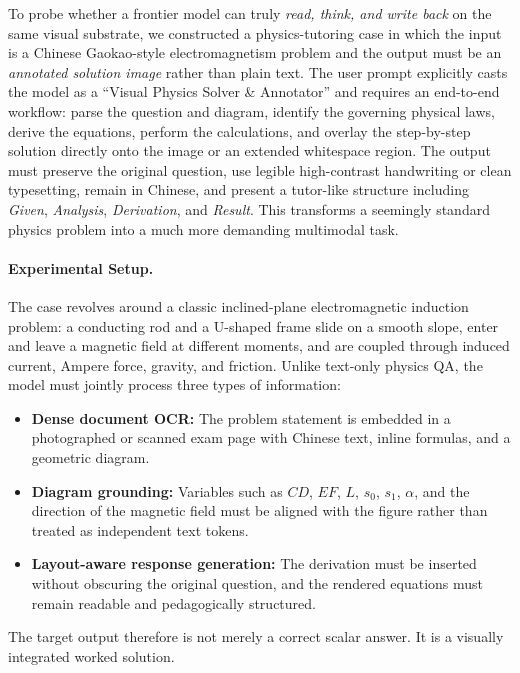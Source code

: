 To probe whether a frontier model can truly \emph{read, think, and write back} on the same visual substrate, we constructed a physics-tutoring case in which the input is a Chinese Gaokao-style electromagnetism problem and the output must be an \emph{annotated solution image} rather than plain text. The user prompt explicitly casts the model as a ``Visual Physics Solver \& Annotator'' and requires an end-to-end workflow: parse the question and diagram, identify the governing physical laws, derive the equations, perform the calculations, and overlay the step-by-step solution directly onto the image or an extended whitespace region. The output must preserve the original question, use legible high-contrast handwriting or clean typesetting, remain in Chinese, and present a tutor-like structure including \emph{Given}, \emph{Analysis}, \emph{Derivation}, and \emph{Result}. This transforms a seemingly standard physics problem into a much more demanding multimodal task.

\paragraph{Experimental Setup.}
The case revolves around a classic inclined-plane electromagnetic induction problem: a conducting rod and a U-shaped frame slide on a smooth slope, enter and leave a magnetic field at different moments, and are coupled through induced current, Ampere force, gravity, and friction. Unlike text-only physics QA, the model must jointly process three types of information:
\begin{itemize}
    \item \textbf{Dense document OCR:} The problem statement is embedded in a photographed or scanned exam page with Chinese text, inline formulas, and a geometric diagram.
    \item \textbf{Diagram grounding:} Variables such as $CD$, $EF$, $L$, $s_0$, $s_1$, $\alpha$, and the direction of the magnetic field must be aligned with the figure rather than treated as independent text tokens.
    \item \textbf{Layout-aware response generation:} The derivation must be inserted without obscuring the original question, and the rendered equations must remain readable and pedagogically structured.
\end{itemize}
The target output therefore is not merely a correct scalar answer. It is a visually integrated worked solution.

